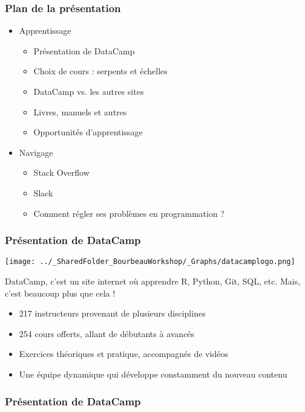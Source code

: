 \documentclass{beamer}
\begin{document}
    \begin{frame}
    
        \frametitle{Plan de la présentation} \vspace{1cm}
        
        \begin{itemize}
        
        \item{Apprentissage}
        
          \begin{itemize}
            \item Présentation de DataCamp 
            \item Choix de cours : serpents et échelles
            \item DataCamp vs. les autres sites
            \item Livres, manuels et autres 
            \item Opportunités d'apprentissage
          \end{itemize}
        
         \item{Navigage}
         
          \begin{itemize}
            \item{Stack Overflow}
            \item{Slack}
            \item{Comment régler ses problèmes en programmation ?}
          \end{itemize}
          
        \end{itemize}
        
    \end{frame}


    \begin{frame}
    
      \frametitle{Présentation de DataCamp} \vspace{1cm}
      
        \begin{center}
         \texttt{[image: ../\_SharedFolder\_BourbeauWorkshop/\_Graphs/datacamplogo.png]}
        \end{center} 
      
    DataCamp, c'est un site internet où apprendre R, Python, Git, SQL, etc. Mais, c'est beaucoup plus que cela !
    
        \begin{itemize}
          \item{217 instructeurs provenant de plusieurs disciplines}
          \item{254 cours offerts, allant de débutants à avancés}
          \item{Exercices théoriques et pratique, accompagnés de vidéos}
          \item{Une équipe dynamique qui développe constamment du nouveau contenu}
        \end{itemize}
          
    \end{frame}
    

    \begin{frame}
    
      \frametitle{Présentation de DataCamp} \vspace{1cm}
    
    \end{frame}
\end{document}
